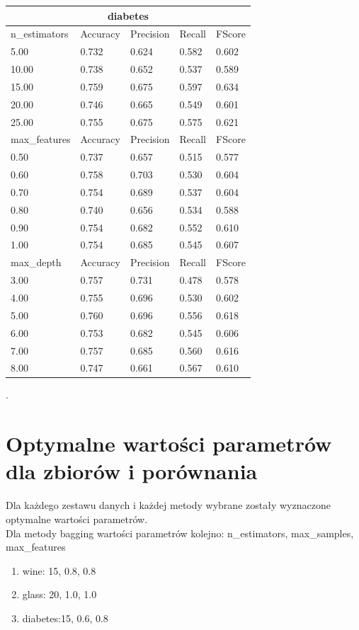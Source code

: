 \documentclass[12pt,a4paper]{article}
\begin{document}
\begin{tabular}{ |p{3cm}||p{2cm}|p{2cm}|p{2cm}|p{2cm}| }
\hline
\multicolumn{5}{|c|}{diabetes}\\
\hline
n\_estimators & Accuracy & Precision & Recall & FScore \\
\hline
5.00 & 0.732 & 0.624 & 0.582 & 0.602\\
10.00 & 0.738 & 0.652 & 0.537 & 0.589\\
15.00 & 0.759 & 0.675 & 0.597 & 0.634\\
20.00 & 0.746 & 0.665 & 0.549 & 0.601\\
25.00 & 0.755 & 0.675 & 0.575 & 0.621\\
\hline
max\_features & Accuracy & Precision & Recall & FScore \\
\hline
0.50 & 0.737 & 0.657 & 0.515 & 0.577\\
0.60 & 0.758 & 0.703 & 0.530 & 0.604\\
0.70 & 0.754 & 0.689 & 0.537 & 0.604\\
0.80 & 0.740 & 0.656 & 0.534 & 0.588\\
0.90 & 0.754 & 0.682 & 0.552 & 0.610\\
1.00 & 0.754 & 0.685 & 0.545 & 0.607\\
\hline
max\_depth & Accuracy & Precision & Recall & FScore \\
\hline
3.00 & 0.757 & 0.731 & 0.478 & 0.578\\
4.00 & 0.755 & 0.696 & 0.530 & 0.602\\
5.00 & 0.760 & 0.696 & 0.556 & 0.618\\
6.00 & 0.753 & 0.682 & 0.545 & 0.606\\
7.00 & 0.757 & 0.685 & 0.560 & 0.616\\
8.00 & 0.747 & 0.661 & 0.567 & 0.610\\
\hline
\end{tabular}
.\\

\section{Optymalne wartości parametrów dla zbiorów i porównania}
Dla każdego zestawu danych i każdej metody wybrane zostały wyznaczone optymalne wartości parametrów. \\Dla metody bagging wartości parametrów kolejno: n\_estimators, max\_samples, max\_features

\begin{enumerate}
  \item wine: 15, 0.8, 0.8
  \item glass: 20, 1.0, 1.0
  \item diabetes:15, 0.6, 0.8
\end{enumerate}
\end{document}
